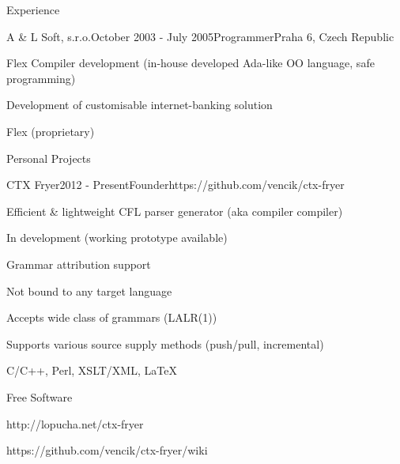 \documentclass{resume} %
\begin{document}
\begin{rSection}{Experience}

\begin{rSubsection}{A \& L Soft, s.r.o.}{October 2003 - July 2005}{Programmer}{Praha 6, Czech Republic}
\item Flex Compiler development (in-house developed Ada-like OO language, safe programming)
\item Development of customisable internet-banking solution
\item Flex (proprietary)
\end{rSubsection}

\end{rSection}


\begin{rSection}{Personal Projects}


\begin{rSubsection}{CTX Fryer}{2012 - Present}{Founder}{https://github.com/vencik/ctx-fryer}
\item Efficient \& lightweight CFL parser generator (aka compiler compiler)
\item In development (working prototype available)
\item Grammar attribution support
\item Not bound to any target language
\item Accepts wide class of grammars (LALR(1))
\item Supports various source supply methods (push/pull, incremental)
\item C/C++, Perl, XSLT/XML, \LaTeX
\item Free Software
\item http://lopucha.net/ctx-fryer
\item https://github.com/vencik/ctx-fryer/wiki
\end{rSubsection}

\end{rSection}

\end{document}
